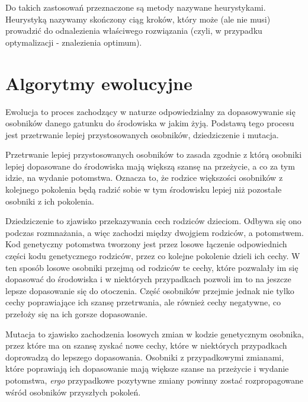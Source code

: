 \documentclass[twoside]{iisthesis}
\newcommand{\ergo}{\emph{ergo }}
\begin{document}
Do takich zastosowań przeznaczone są metody nazywane heurystykami. Heurystyką nazywamy skończony ciąg kroków, który może (ale nie musi) prowadzić do odnalezienia właściwego rozwiązania (czyli, w przypadku optymalizacji - znalezienia optimum).

\section{Algorytmy ewolucyjne} \label{section:eaShortDesc}

Ewolucja to proces zachodzący w naturze odpowiedzialny za dopasowywanie się osobników danego gatunku do środowiska w jakim żyją. Podstawą tego procesu jest przetrwanie lepiej przystosowanych osobników, dziedziczenie i mutacja.

Przetrwanie lepiej przystosowanych osobników to zasada zgodnie z którą osobniki lepiej dopasowane do środowiska mają większą szansę na przeżycie, a co za tym idzie, na wydanie potomstwa. Oznacza to, że rodzice większości osobników z kolejnego pokolenia będą radzić sobie w tym środowisku lepiej niż pozostałe osobniki z ich pokolenia.

Dziedziczenie to zjawisko przekazywania cech rodziców dzieciom. Odbywa się ono podczas rozmnażania, a więc zachodzi między dwojgiem rodziców, a potomstwem. Kod genetyczny potomstwa tworzony jest przez losowe łączenie odpowiednich części kodu genetycznego rodziców, przez co kolejne pokolenie dzieli ich cechy. W ten sposób losowe osobniki przejmą od rodziców te cechy, które pozwalały im się dopasować do środowiska i w niektórych przypadkach pozwoli im to na jeszcze lepsze dopasowanie się do otoczenia. Część osobników przejmie jednak nie tylko cechy poprawiające ich szansę przetrwania, ale również cechy negatywne, co przełoży się na ich gorsze dopasowanie.

Mutacja to zjawisko zachodzenia losowych zmian w kodzie genetycznym osobnika, przez które ma on szansę zyskać nowe cechy, które w niektórych przypadkach doprowadzą do lepszego dopasowania. Osobniki z przypadkowymi zmianami, które poprawiają ich dopasowanie mają większe szanse na przeżycie i wydanie potomstwa, \ergo przypadkowe pozytywne zmiany powinny zostać rozpropagowane wśród osobników przyszłych pokoleń.
\end{document}
